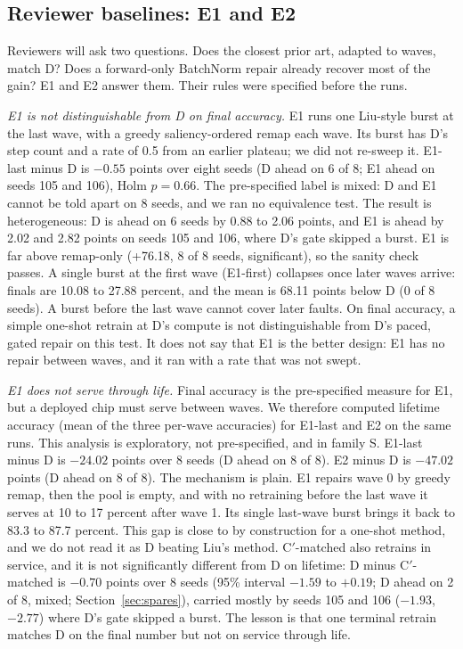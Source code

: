 \documentclass[journal]{IEEEtran}
\begin{document}
\subsection{Reviewer baselines: E1 and E2}
\label{sec:e1e2}
Reviewers will ask two questions.
Does the closest prior art, adapted to waves, match D?
Does a forward-only BatchNorm repair already recover most of the gain?
E1 and E2 answer them.
Their rules were specified before the runs.

\emph{E1 is not distinguishable from D on final accuracy.}
E1 runs one Liu-style burst at the last wave, with a greedy saliency-ordered remap each wave.
Its burst has D's step count and a rate of 0.5 from an earlier plateau; we did not re-sweep it.
E1-last minus D is $-0.55$ points over eight seeds (D ahead on 6 of 8; E1 ahead on seeds 105 and 106), Holm $p=0.66$.
The pre-specified label is mixed: D and E1 cannot be told apart on 8 seeds, and we ran no equivalence test.
The result is heterogeneous: D is ahead on 6 seeds by 0.88 to 2.06 points, and E1 is ahead by 2.02 and 2.82 points on seeds 105 and 106, where D's gate skipped a burst.
E1 is far above remap-only (+76.18, 8 of 8 seeds, significant), so the sanity check passes.
A single burst at the first wave (E1-first) collapses once later waves arrive: finals are 10.08 to 27.88 percent, and the mean is 68.11 points below D (0 of 8 seeds).
A burst before the last wave cannot cover later faults.
On final accuracy, a simple one-shot retrain at D's compute is not distinguishable from D's paced, gated repair on this test.
It does not say that E1 is the better design: E1 has no repair between waves, and it ran with a rate that was not swept.

\emph{E1 does not serve through life.}
Final accuracy is the pre-specified measure for E1, but a deployed chip must serve between waves.
We therefore computed lifetime accuracy (mean of the three per-wave accuracies) for E1-last and E2 on the same runs.
This analysis is exploratory, not pre-specified, and in family S.
E1-last minus D is $-24.02$ points over 8 seeds (D ahead on 8 of 8).
E2 minus D is $-47.02$ points (D ahead on 8 of 8).
The mechanism is plain.
E1 repairs wave 0 by greedy remap, then the pool is empty, and with no retraining before the last wave it serves at 10 to 17 percent after wave 1.
Its single last-wave burst brings it back to 83.3 to 87.7 percent.
This gap is close to by construction for a one-shot method, and we do not read it as D beating Liu's method.
C$'$-matched also retrains in service, and it is not significantly different from D on lifetime: D minus C$'$-matched is $-0.70$ points over 8 seeds (95\% interval $-1.59$ to $+0.19$; D ahead on 2 of 8, mixed; Section~\ref{sec:spares}), carried mostly by seeds 105 and 106 ($-1.93$, $-2.77$) where D's gate skipped a burst.
The lesson is that one terminal retrain matches D on the final number but not on service through life.
\end{document}
